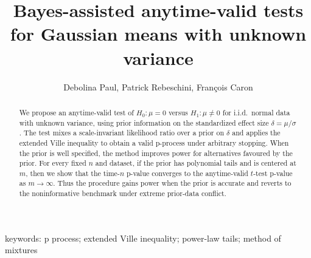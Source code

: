 \documentclass{article}%
\begin{document}
\title{Bayes-assisted anytime-valid tests for Gaussian means with unknown variance}
\author{Debolina Paul, Patrick Rebeschini, François Caron}
\maketitle

\begin{abstract}
We propose an anytime-valid test of $H_0:\mu=0$ versus $H_1:\mu\neq 0$ for i.i.d.\ normal data with unknown variance, using prior information on the standardized effect size $\delta=\mu/\sigma$. The test mixes a scale-invariant likelihood ratio over a prior on $\delta$ and applies the extended Ville inequality to obtain a valid p-process under arbitrary stopping. When the prior is well specified, the method improves power for alternatives favoured by the prior. For every fixed $n$ and dataset, if the prior has polynomial tails and is centered at $m$, then we show that the time-$n$ p-value converges to the anytime-valid $t$-test p-value as $m\to\infty$. Thus the procedure gains power when the prior is accurate and reverts to the noninformative benchmark under extreme prior-data conflict.
\end{abstract}

keywords: p process; extended Ville inequality; power-law tails; method of mixtures 
\end{document}
